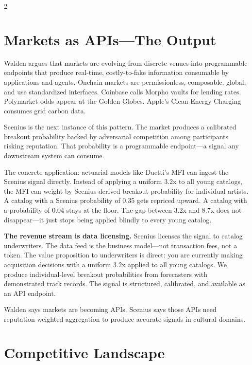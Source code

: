 \documentclass[9pt,oneside]{amsart}
\begin{document}
\begin{multicols}{2}
\section{Markets as APIs---The Output}

Walden argues that markets are evolving from discrete venues into programmable endpoints that produce real-time, costly-to-fake information consumable by applications and agents. Onchain markets are permissionless, composable, global, and use standardized interfaces. Coinbase calls Morpho vaults for lending rates. Polymarket odds appear at the Golden Globes. Apple's Clean Energy Charging consumes grid carbon data.

Scenius is the next instance of this pattern. The market produces a calibrated breakout probability backed by adversarial competition among participants risking reputation. That probability is a programmable endpoint---a signal any downstream system can consume.

The concrete application: actuarial models like Duetti's MFI can ingest the Scenius signal directly. Instead of applying a uniform 3.2x to all young catalogs, the MFI can weight by Scenius-derived breakout probability for individual artists. A catalog with a Scenius probability of 0.35 gets repriced upward. A catalog with a probability of 0.04 stays at the floor. The gap between 3.2x and 8.7x does not disappear---it just stops being applied blindly to every young catalog.

\textbf{The revenue stream is data licensing.} Scenius licenses the signal to catalog underwriters. The data feed is the business model---not transaction fees, not a token. The value proposition to underwriters is direct: you are currently making acquisition decisions with a uniform 3.2x applied to all young catalogs. We produce individual-level breakout probabilities from forecasters with demonstrated track records. The signal is structured, calibrated, and available as an API endpoint.

Walden says markets are becoming APIs. Scenius says those APIs need reputation-weighted aggregation to produce accurate signals in cultural domains.

\section{Competitive Landscape}


\end{multicols}
\end{document}
